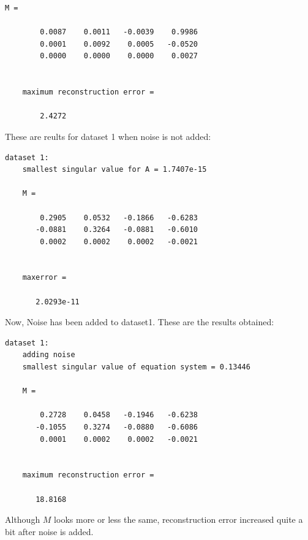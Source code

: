 \documentclass[11pt]{article}
\begin{document}
\begin{enumerate}
\begin{itemize}
\begin{Verbatim}[frame=single]
	M =

	    0.0087    0.0011   -0.0039    0.9986
	    0.0001    0.0092    0.0005   -0.0520
	    0.0000    0.0000    0.0000    0.0027


	maximum reconstruction error =

	    2.4272
	\end{Verbatim}

	These are reults for dataset 1 when noise is not added:
	\begin{Verbatim}[frame=single]
	dataset 1: 
	smallest singular value for A = 1.7407e-15

	M =

	    0.2905    0.0532   -0.1866   -0.6283
	   -0.0881    0.3264   -0.0881   -0.6010
	    0.0002    0.0002    0.0002   -0.0021


	maxerror =

	   2.0293e-11
	\end{Verbatim}

	Now, Noise has been added to dataset1. These are the results obtained: 
	\begin{Verbatim}[frame=single]
	dataset 1: 
	adding noise
	smallest singular value of equation system = 0.13446

	M =

	    0.2728    0.0458   -0.1946   -0.6238
	   -0.1055    0.3274   -0.0880   -0.6086
	    0.0001    0.0002    0.0002   -0.0021


	maximum reconstruction error =

	   18.8168
	\end{Verbatim}

	Although $M$ looks more or less the same, reconstruction error increased quite a bit after noise is added.
\end{itemize}



\end{enumerate}
\end{document}
